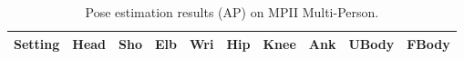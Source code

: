 \tabcolsep 1.5pt
\begin{table}[tbp]
 \scriptsize
  \centering
  \begin{tabular}{@{} l c ccc ccc cc@{}}
    \toprule
    Setting& Head   & Sho  & Elb & Wri & Hip & Knee & Ank & UBody & FBody \\
    \midrule



    
    
    
    \midrule
    
    
    
    \midrule
    
     

    
    \bottomrule
  \end{tabular}
  \vspace{0.1em}
\caption[]{Pose estimation results (AP) on MPII Multi-Person.}
    \vspace{-1.5em}
  \label{tab:multicut:mpii-multi}
\end{table}
